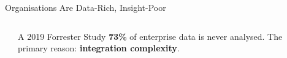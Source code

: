 \documentclass[aspectratio=169,10pt]{beamer}
\begin{document}
\begin{frame}{Organisations Are Data-Rich, Insight-Poor}
\begin{columns}[T]
\begin{center}
      \end{center}
      \vspace{4pt}
      \begin{exampleblock}{A 2019 Forrester Study}
        \small \textbf{73\%} of enterprise data is never analysed.  The primary reason: \textbf{integration complexity}.
      \end{exampleblock}
  \end{columns}
\end{frame}
\end{document}
